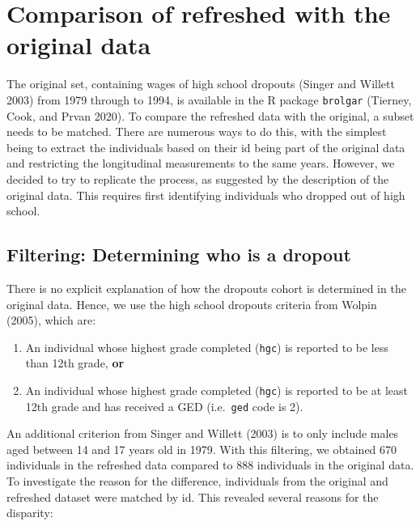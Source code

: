 \documentclass{article}
\providecommand{\tightlist}{%
  \setlength{\itemsep}{0pt}\setlength{\parskip}{0pt}}
\begin{document}
\hypertarget{compare}{%
\section{Comparison of refreshed with the original data}\label{compare}}

The original set, containing wages of high school dropouts (Singer and Willett 2003) from 1979 through to 1994, is available in the R package \texttt{brolgar} (Tierney, Cook, and Prvan 2020). To compare the refreshed data with the original, a subset needs to be matched. There are numerous ways to do this, with the simplest being to extract the individuals based on their id being part of the original data and restricting the longitudinal measurements to the same years. However, we decided to try to replicate the process, as suggested by the description of the original data. This requires first identifying individuals who dropped out of high school.

\hypertarget{filtering-determining-who-is-a-dropout}{%
\subsection{Filtering: Determining who is a dropout}\label{filtering-determining-who-is-a-dropout}}

There is no explicit explanation of how the dropouts cohort is determined in the original data. Hence, we use the high school dropouts criteria from Wolpin (2005), which are:

\begin{enumerate}
\def\labelenumi{\arabic{enumi}.}
\tightlist
\item
  An individual whose highest grade completed (\texttt{hgc}) is reported to be less than 12th grade, \textbf{or}
\item
  An individual whose highest grade completed (\texttt{hgc}) is reported to be at least 12th grade and has received a GED (i.e.~\texttt{ged} code is 2).
\end{enumerate}

An additional criterion from Singer and Willett (2003) is to only include males aged between 14 and 17 years old in 1979. With this filtering, we obtained 670 individuals in the refreshed data compared to 888 individuals in the original data. To investigate the reason for the difference, individuals from the original and refreshed dataset were matched by id. This revealed several reasons for the disparity:
\end{document}
